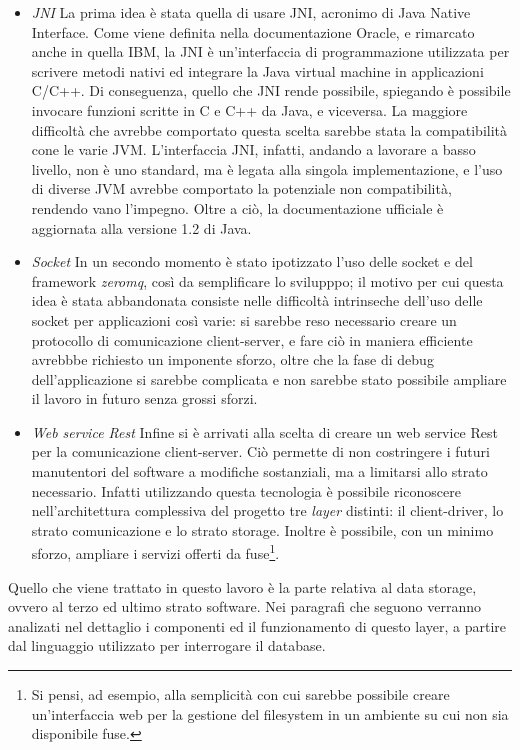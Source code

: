 \begin{itemize}
\item \emph{JNI} La prima idea è stata quella di usare JNI, acronimo di Java Native Interface. Come viene definita nella documentazione Oracle, e rimarcato anche in quella IBM, la JNI è un'interfaccia di programmazione utilizzata per scrivere metodi nativi ed integrare la Java virtual machine in applicazioni C/C++. Di conseguenza, quello che JNI rende possibile, spiegando è possibile invocare funzioni scritte in C e C++ da Java, e viceversa.
La maggiore difficoltà che avrebbe comportato questa scelta sarebbe stata la compatibilità cone le varie JVM. L'interfaccia JNI, infatti, andando a lavorare a basso livello, non è uno standard, ma è legata alla singola implementazione, e l'uso di diverse JVM avrebbe comportato la potenziale non compatibilità, rendendo vano l'impegno.
Oltre a ciò, la documentazione ufficiale è aggiornata alla versione 1.2 di Java.
\item \emph{Socket} In un secondo momento è stato ipotizzato l'uso delle socket e del framework \emph{zeromq}, così da semplificare lo svilupppo; il motivo per cui questa idea è stata abbandonata consiste nelle difficoltà intrinseche dell'uso delle socket per applicazioni così varie: si sarebbe reso necessario creare un protocollo di comunicazione client-server, e fare ciò in maniera efficiente avrebbbe richiesto un imponente sforzo, oltre che la fase di debug dell'applicazione si sarebbe complicata e non sarebbe stato possibile ampliare il lavoro in futuro senza grossi sforzi.
\item \emph{Web service Rest} Infine si è arrivati alla scelta di creare un web service Rest per la comunicazione client-server. Ciò permette di non costringere i futuri manutentori del software a modifiche sostanziali, ma a limitarsi allo strato necessario. Infatti utilizzando questa tecnologia è possibile riconoscere nell'architettura complessiva del progetto tre \emph{layer} distinti: il client-driver, lo strato comunicazione e lo strato storage. Inoltre è possibile, con un minimo sforzo, ampliare i servizi offerti da fuse\footnote{Si pensi, ad esempio, alla semplicità con cui sarebbe possibile creare un'interfaccia web per la gestione del filesystem in un ambiente su cui non sia disponibile fuse.}.
\end{itemize}
Quello che viene trattato in questo lavoro è la parte relativa al data storage, ovvero al terzo ed ultimo strato software.
Nei paragrafi che seguono verranno analizati nel dettaglio i componenti ed il funzionamento di questo layer, a partire dal linguaggio utilizzato per interrogare il database.
